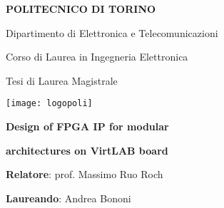 \documentclass[10pt, english, a4paper, titlepage, oneside]{book}
\begin{document}
 

\begin{titlepage}
    \centerline{ \Huge\bf POLITECNICO DI TORINO }
    \vspace{2cm}
    \centerline{ \large Dipartimento di Elettronica e Telecomunicazioni } 
    \vspace{5mm}
    \centerline{ \large Corso di Laurea in Ingegneria Elettronica }
    \vspace{5mm}
    \centerline{ \large Tesi di Laurea Magistrale }
    \vspace{3cm}
    \centerline{ \texttt{[image: logopoli]} }
    \vspace{3cm}
    \centerline{ \Huge\bf Design of FPGA IP for modular }
    \vspace{5mm}
    \centerline{ \Huge\bf architectures on VirtLAB board }
    \vspace{4cm}
    \centerline{ \large \textbf{Relatore}: prof. Massimo Ruo Roch }
    \vspace{5mm}
    \centerline{ \large \textbf{Laureando}: Andrea Bononi }
\end{titlepage}

\tableofcontents

\printglossary[type=\acronymtype, nonumberlist]

\end{document}
